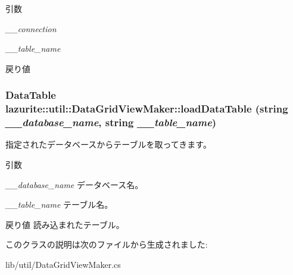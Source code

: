 \begin{DoxyParams}{引数}
\item[{\em \_\-\_\-connection}]\item[{\em \_\-\_\-table\_\-name}]\end{DoxyParams}
\begin{DoxyReturn}{戻り値}

\end{DoxyReturn}
\hypertarget{classlazurite_1_1util_1_1_data_grid_view_maker_a0ba85be729407fe9b20928061a4d4ce9}{
\subsubsection[{loadDataTable}]{\setlength{\rightskip}{0pt plus 5cm}DataTable lazurite::util::DataGridViewMaker::loadDataTable (string {\em \_\-\_\-database\_\-name}, \/  string {\em \_\-\_\-table\_\-name})}}
\label{classlazurite_1_1util_1_1_data_grid_view_maker_a0ba85be729407fe9b20928061a4d4ce9}


指定されたデータベースからテーブルを取ってきます。 
\begin{DoxyParams}{引数}
\item[{\em \_\-\_\-database\_\-name}]データベース名。\item[{\em \_\-\_\-table\_\-name}]テーブル名。\end{DoxyParams}
\begin{DoxyReturn}{戻り値}
読み込まれたテーブル。
\end{DoxyReturn}


このクラスの説明は次のファイルから生成されました:\begin{DoxyCompactItemize}
\item 
lib/util/DataGridViewMaker.cs\end{DoxyCompactItemize}

